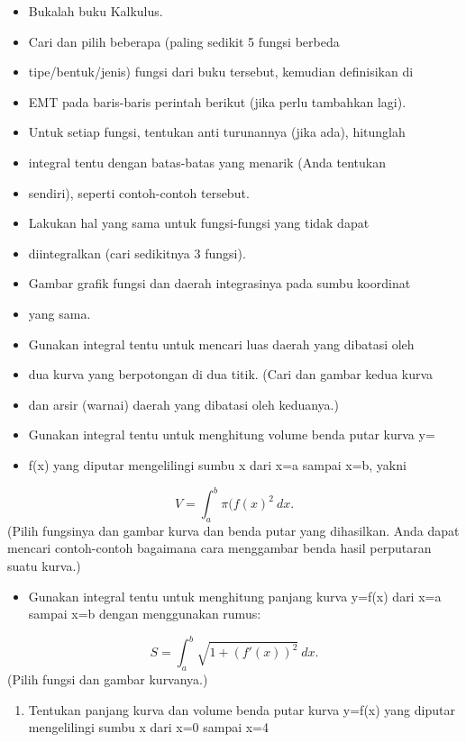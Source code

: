 \documentclass[
]{book}
\providecommand{\tightlist}{%
  \setlength{\itemsep}{0pt}\setlength{\parskip}{0pt}}
\begin{document}
\begin{itemize}
\item
  Bukalah buku Kalkulus.
\item
  Cari dan pilih beberapa (paling sedikit 5 fungsi berbeda
\item
  tipe/bentuk/jenis) fungsi dari buku tersebut, kemudian definisikan di
\item
  EMT pada baris-baris perintah berikut (jika perlu tambahkan lagi).
\item
  Untuk setiap fungsi, tentukan anti turunannya (jika ada), hitunglah
\item
  integral tentu dengan batas-batas yang menarik (Anda tentukan
\item
  sendiri), seperti contoh-contoh tersebut.
\item
  Lakukan hal yang sama untuk fungsi-fungsi yang tidak dapat
\item
  diintegralkan (cari sedikitnya 3 fungsi).
\item
  Gambar grafik fungsi dan daerah integrasinya pada sumbu koordinat
\item
  yang sama.
\item
  Gunakan integral tentu untuk mencari luas daerah yang dibatasi oleh
\item
  dua kurva yang berpotongan di dua titik. (Cari dan gambar kedua kurva
\item
  dan arsir (warnai) daerah yang dibatasi oleh keduanya.)
\item
  Gunakan integral tentu untuk menghitung volume benda putar kurva y=
\item
  f(x) yang diputar mengelilingi sumbu x dari x=a sampai x=b, yakni
\end{itemize}

\[V = \int_a^b \pi (f(x)^2\ dx.\](Pilih fungsinya dan gambar kurva dan benda putar yang dihasilkan. Anda dapat mencari contoh-contoh bagaimana cara menggambar benda hasil perputaran suatu kurva.)

\begin{itemize}
\tightlist
\item
  Gunakan integral tentu untuk menghitung panjang kurva y=f(x) dari x=a sampai x=b dengan menggunakan rumus:
\end{itemize}

\[S = \int_a^b \sqrt{1+(f'(x))^2} \ dx.\](Pilih fungsi dan gambar kurvanya.)

\begin{enumerate}
\def\labelenumi{\arabic{enumi}.}
\tightlist
\item
  Tentukan panjang kurva dan volume benda putar kurva y=f(x) yang diputar mengelilingi sumbu x dari x=0 sampai x=4
\end{enumerate}
\end{document}
